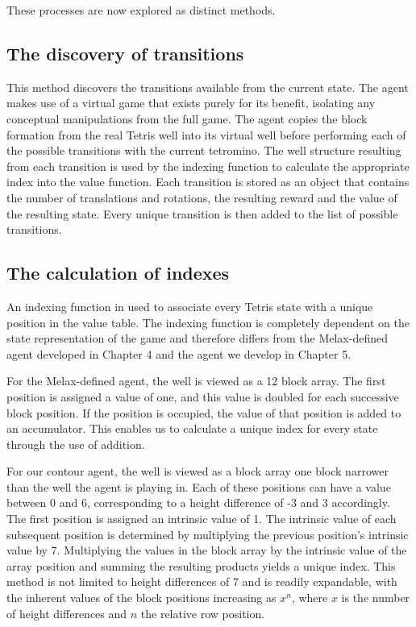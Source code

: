 \documentclass{rucsthesis}
\begin{document}
These processes are now explored as distinct methods. 

\subsection{The discovery of transitions}

This method discovers the transitions available from the current state. The agent makes use of a virtual game that exists purely for its benefit, isolating any conceptual manipulations from the full game. The agent copies the block formation from the real Tetris well into its virtual well before performing each of the possible transitions with the current tetromino. The well structure resulting from each transition is used by the indexing function to calculate the appropriate index into the value function. Each transition is stored as an object that contains the number of translations and rotations, the resulting reward and the value of the resulting state.  Every unique transition is then added to the list of possible transitions.

\subsection{The calculation of indexes}

An indexing function in used to associate every Tetris state with a unique position in the value table. The indexing function is completely dependent on the state representation of the game and therefore differs from the Melax-defined agent developed in Chapter 4 and the agent we develop in Chapter 5.

For the Melax-defined agent, the well is viewed as a 12 block array. The first position is assigned a value of one, and this value is doubled for each successive block position. If the position is occupied, the value of that position is added to an accumulator. This enables us to calculate a unique index for every state through the use of addition.

For our contour agent, the well is viewed as a block array one block narrower than the well the agent is playing in. Each of these positions can have a value between 0 and 6, corresponding to a height difference of -3 and 3 accordingly. The first position is assigned an intrinsic value of 1. The intrinsic value of each subsequent position is determined by multiplying the previous position's intrinsic value by 7. Multiplying the values in the block array by the intrinsic value of the array position and summing the resulting products yields a unique index. This method is not limited to height differences of 7 and is readily expandable, with the inherent values of the block positions increasing as $x^n$, where $x$ is the number of height differences and $n$ the relative row position.
\end{document}
